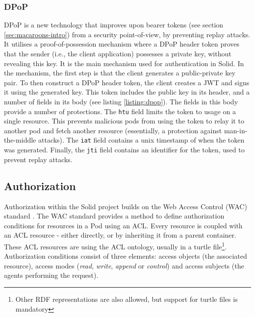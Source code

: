 \subsubsection{DPoP}
\label{sec:dpop}
\acrfull{DPoP} \citep{ietf-oauth-dpop} is a new technology that improves upon bearer tokens (see section \ref{sec:macaroons-intro}) from a security point-of-view, by preventing replay attacks. It utilises a proof-of-possession mechanism where a \gls{DPoP} header token proves that the sender (i.e., the client application) possesses a private key, without revealing this key. It is the main mechanism used for authentication in Solid. In the mechanism, the first step is that the client generates a public-private key pair. To then construct a \gls{DPoP} header token, the client creates a \gls{JWT} and signs it using the generated key. This token includes the public key in its header, and a number of fields in its body (see listing \ref{listing:dpop}).
{}
\noindent The fields in this body provide a number of protections. The \texttt{htu} field limits the token to usage on a single resource. This prevents malicious pods from using the token to relay it to another pod and fetch another resource (essentially, a protection against man-in-the-middle attacks). The \texttt{iat} field contains a unix timestamp of when the token was generated. Finally, the \texttt{jti} field contains an identifier for the token, used to prevent replay attacks.

\subsection{Authorization}
Authorization within the Solid project builds on the Web Access Control (WAC) standard \citep{wac}. The WAC standard provides a method to define authorization conditions for resources in a Pod using an \gls{ACL}. Every resource is coupled with an \gls{ACL} resource - either directly, or by inheriting it from a parent container. These \gls{ACL} resources are using the \gls{ACL} ontology, usually in a turtle file\footnote{Other \gls{RDF} representations are also allowed, but support for turtle files is mandatory}. Authorization conditions consist of three elements: access objects (the associated resource), access modes (\textit{read}, \textit{write}, \textit{append} or \textit{control}) and access subjects (the agents performing the request).

